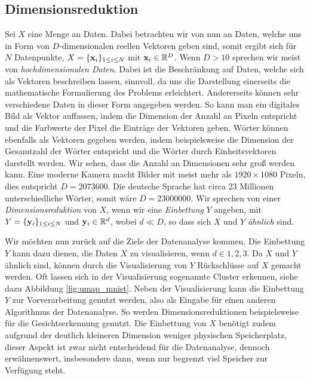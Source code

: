 \subsection*{Dimensionsreduktion}
	Sei $X$ eine Menge an Daten. Dabei betrachten wir von nun an Daten, welche uns in Form von 
	$D$-dimensionalen reellen Vektoren geben sind, somit ergibt sich für $N$ Datenpunkte, 
	$X = \{\mathbf{x}_i\}_{1 \leq i \leq N}$ mit $\mathbf{x}_i \in \mathbb{R}^D$. 
	Wenn $D > 10$ sprechen wir meist von \textit{hochdimensionalen Daten}.
	Dabei ist die Beschränkung auf Daten, welche sich als Vektoren beschreiben lassen, sinnvoll, da 
	uns die Darstellung einerseits die mathematische Formulierung des Problems erleichtert. 
	Andererseits können sehr verschiedene Daten in dieser Form angegeben werden. 
	So kann man ein digitales Bild als Vektor auffassen, indem die Dimension der Anzahl 
	an Pixeln entspricht und die Farbwerte der Pixel die Einträge der Vektoren geben. 
	Wörter können ebenfalls als Vektoren gegeben werden, indem beispielsweise die Dimension der 
	Gesamtzahl der Wörter entspricht und die Wörter durch Einheitsvektoren darstellt werden. 
	Wir sehen, dass die Anzahl an Dimensionen sehr groß werden kann. Eine moderne Kamera 
	macht Bilder mit meist mehr als $1920 \times 1080$ Pixeln, dies entspricht $D = \num{2073600}$. 
	Die deutsche Sprache hat circa 23 Millionen unterschiedliche Wörter, somit wäre $D = \num{23000000}$. 
	Wir sprechen von einer \textit{Dimensionsreduktion} von $X$, wenn wir eine \textit{Einbettung} $Y$ angeben, 
	mit $Y = \{\mathbf{y}_i\}_{1 \leq i \leq N}$ und $\mathbf{y}_i \in \mathbb{R}^d$, wobei $d \ll D$, so dass 
	sich $X$ und $Y$ \textit{ähnlich} sind. 

	Wir möchten nun zurück auf die Ziele der Datenanalyse kommen. Die Einbettung $Y$ kann dazu 
	dienen, die Daten $X$ zu visualisieren, wenn $d \in {1,2,3}$. Da $X$ und $Y$ ähnlich sind, 
	können durch die Visualisierung von $Y$ Rückschlüsse auf $X$ gemacht werden. Oft lassen sich 
	in der Visualisierung sogenannte Cluster erkennen, siehe dazu Abbildung \ref{fig:umap_mnist}. 
	Neben der Visualisierung kann die Einbettung $Y$ zur Vorverarbeitung genutzt werden, also als 
	Eingabe für einen anderen Algorithmus der Datenanalyse. So werden Dimensionsreduktionen 
	beispielsweise für die Gesichtserkennung genutzt. 
	Die Einbettung von $X$ benötigt zudem aufgrund der deutlich kleineren Dimension weniger physischen 
	Speicherplatz, dieser Aspekt ist zwar nicht entscheidend für die Datenanalyse, dennoch erwähnenswert, 
	insbesondere dann, wenn nur begrenzt viel Speicher zur Verfügung steht. 

